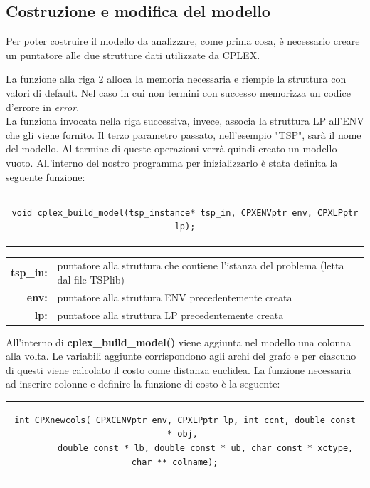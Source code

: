 \subsection{Costruzione e modifica del modello}
Per poter costruire il modello da analizzare, come prima cosa, è necessario creare un puntatore alle due strutture dati utilizzate da CPLEX.

La funzione alla riga 2 alloca la memoria necessaria e riempie la struttura con valori di default. Nel caso in cui non termini con successo memorizza un codice d'errore in \textit{error}.\\
La funziona invocata nella riga successiva, invece, associa la struttura LP all'ENV che gli viene fornito. Il terzo parametro passato, nell'esempio "TSP", sarà il nome del modello. Al termine di queste operazioni verrà quindi creato un modello vuoto. All'interno del nostro programma per inizializzarlo è stata definita la seguente funzione:
\begin{center}
\begin{tabular}{c}
\begin{lstlisting}[linewidth=370pt, basicstyle=\footnotesize\sffamily,] 
void cplex_build_model(tsp_instance* tsp_in, CPXENVptr env, CPXLPptr lp);
\end{lstlisting}
\end{tabular}
\end{center}
\begin{table}[h]
\centering
\begin{tabular}{rl}
\textbf{tsp\_in: } & {puntatore alla struttura che contiene l'istanza del problema (letta dal file TSPlib)} \\
\textbf{env: } & {puntatore alla struttura ENV precedentemente creata}\\
\textbf{lp: } & {puntatore alla struttura LP  precedentemente creata}\\
\end{tabular}
\end{table}
All'interno di \textbf{cplex\_build\_model()} viene aggiunta nel modello una colonna alla volta. Le variabili aggiunte corrispondono agli archi del grafo e per ciascuno di questi viene calcolato il costo come distanza euclidea. La funzione necessaria ad inserire colonne e definire la funzione di costo è la seguente:
\begin{center}
\begin{tabular}{c}
\begin{lstlisting}[linewidth=400pt, basicstyle=\footnotesize\sffamily,] 
int CPXnewcols( CPXCENVptr env, CPXLPptr lp, int ccnt, double const * obj, 
		double const * lb, double const * ub, char const * xctype, char ** colname);    
\end{lstlisting}
\end{tabular}
\end{center}
